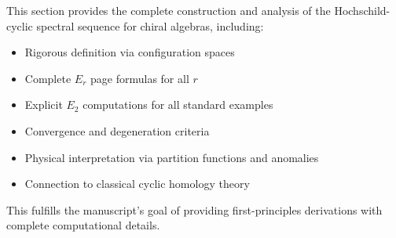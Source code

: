 \begin{remark}
This section provides the complete construction and analysis of the Hochschild-cyclic 
spectral sequence for chiral algebras, including:
\begin{itemize}
\item Rigorous definition via configuration spaces
\item Complete $E_r$ page formulas for all $r$
\item Explicit $E_2$ computations for all standard examples
\item Convergence and degeneration criteria
\item Physical interpretation via partition functions and anomalies
\item Connection to classical cyclic homology theory
\end{itemize}

This fulfills the manuscript's goal of providing first-principles derivations with 
complete computational details.
\end{remark}

